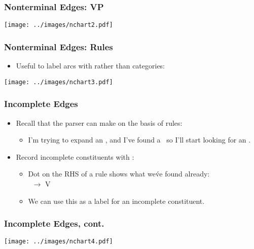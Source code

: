 \begin{frame}[fragile]
\frametitle{Nonterminal Edges: VP}

\begin{center}
\texttt{[image: ../images/nchart2.pdf]}  
\end{center}

\end{frame}

\begin{frame}[fragile]
\frametitle{Nonterminal Edges: Rules}

\begin{itemize}
\item Useful to label arcs with  rather than categories:
\end{itemize}

\begin{center}
\texttt{[image: ../images/nchart3.pdf]}  
\end{center}

\end{frame}

\begin{frame}[fragile]
\frametitle{Incomplete Edges}

\begin{itemize}
\item Recall that the parser can make  on the basis of rules:
  \begin{itemize}
  \item I'm trying to expand an \VP, and I've found a \V\ so I'll start looking for an \NP.
  \end{itemize}
\item Record incomplete constituents with :
  \begin{itemize}
  \item Dot on the RHS of a rule shows what we\'ve found already:\\
 \VP\ $\rightarrow$ V \,\,\bigdot\,\, \NP
\item We can use this as a label for an incomplete constituent.
  \end{itemize}
\end{itemize}

\end{frame}

\begin{frame}[fragile]
\frametitle{Incomplete Edges, cont.}

\begin{center}
\texttt{[image: ../images/nchart4.pdf]}  
\end{center}

\end{frame}

